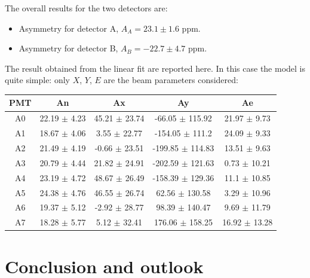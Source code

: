 The overall results for the two detectors are: 
\begin{itemize}
\item Asymmetry for detector A, $A_{A} =  23.1 \pm 1.6$ ppm.
\item Asymmetry for detector B, $A_{B} = -22.7 \pm 4.7$ ppm.
\end{itemize}

The result obtained from the linear fit are reported here. In this case the model is quite simple: only $X$, $Y$, $E$ are the beam parameters considered:
\begin{table}[h]
\centering
\begin{tabular}{|c|c|c|c|c|}
\hline
 PMT   & An             & Ax              & Ay                 & Ae              \\
\hline
 A0    & 22.19 $\pm$ 4.23 & 45.21 $\pm$ 23.74 & -66.05 $\pm$ 115.92  & 21.97 $\pm$ 9.73  \\
 A1    & 18.67 $\pm$ 4.06 & 3.55 $\pm$ 22.77  & -154.05 $\pm$ 111.2  & 24.09 $\pm$ 9.33  \\
 A2    & 21.49 $\pm$ 4.19 & -0.66 $\pm$ 23.51 & -199.85 $\pm$ 114.83 & 13.51 $\pm$ 9.63  \\
 A3    & 20.79 $\pm$ 4.44 & 21.82 $\pm$ 24.91 & -202.59 $\pm$ 121.63 & 0.73 $\pm$ 10.21  \\
 A4    & 23.19 $\pm$ 4.72 & 48.67 $\pm$ 26.49 & -158.39 $\pm$ 129.36 & 11.1 $\pm$ 10.85  \\
 A5    & 24.38 $\pm$ 4.76 & 46.55 $\pm$ 26.74 & 62.56 $\pm$ 130.58   & 3.29 $\pm$ 10.96  \\
 A6    & 19.37 $\pm$ 5.12 & -2.92 $\pm$ 28.77 & 98.39 $\pm$ 140.47   & 9.69 $\pm$ 11.79  \\
 A7    & 18.28 $\pm$ 5.77 & 5.12 $\pm$ 32.41  & 176.06 $\pm$ 158.25  & 16.92 $\pm$ 13.28 \\
\hline
\end{tabular}
\end{table}


\chapter{Conclusion and outlook} \label{conclusion}

